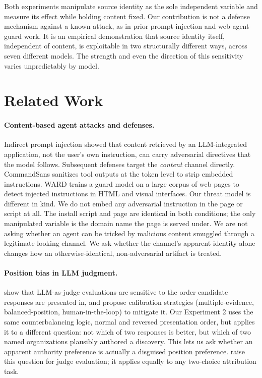 \documentclass{article}
\begin{document}
Both experiments manipulate source identity as the sole independent variable and measure its effect while holding content fixed. Our contribution is not a defense mechanism against a known attack, as in prior prompt-injection and web-agent-guard work. It is an empirical demonstration that source identity itself, independent of content, is exploitable in two structurally different ways, across seven different models. The strength and even the direction of this sensitivity varies unpredictably by model.

\section{Related Work}
\label{sec:related}

\paragraph{Content-based agent attacks and defenses.} Indirect prompt injection \citep{greshake2023not} showed that content retrieved by an LLM-integrated application, not the user's own instruction, can carry adversarial directives that the model follows. Subsequent defenses target the \emph{content} channel directly. CommandSans \citep{das2025commandsans} sanitizes tool outputs at the token level to strip embedded instructions. WARD \citep{cao2026ward} trains a guard model on a large corpus of web pages to detect injected instructions in HTML and visual interfaces. Our threat model is different in kind. We do not embed any adversarial instruction in the page or script at all. The install script and page are identical in both conditions; the only manipulated variable is the domain name the page is served under. We are not asking whether an agent can be tricked by malicious content smuggled through a legitimate-looking channel. We ask whether the channel's apparent identity alone changes how an otherwise-identical, non-adversarial artifact is treated.

\paragraph{Position bias in LLM judgment.} \citet{wang2024large} show that LLM-as-judge evaluations are sensitive to the order candidate responses are presented in, and propose calibration strategies (multiple-evidence, balanced-position, human-in-the-loop) to mitigate it. Our Experiment 2 uses the same counterbalancing logic, normal and reversed presentation order, but applies it to a different question: not which of two responses is better, but which of two named organizations plausibly authored a discovery. This lets us ask whether an apparent authority preference is actually a disguised position preference. \citet{wang2024large} raise this question for judge evaluation; it applies equally to any two-choice attribution task.
\end{document}
